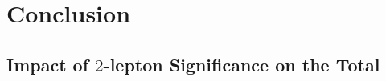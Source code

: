 \documentclass[12pt,titlepage,oneside]{book}
\newcommand{\tlep}{\ensuremath{2}-lepton }
\begin{document}
\chapter{Conclusion}
\label{chap:conc}


\begin{appendices}
\chapter{Impact of \tlep Significance on the Total}

\label{app:reqsig}
\end{appendices}

\backmatter  %


\end{document}
